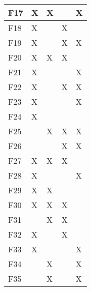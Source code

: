 \begin{tabular}{|l|l|l|l|l|}
F17                                                               & X      & X   &       & X          \\ \hline
F18                                                               & X      &     & X     &            \\ \hline
F19                                                               & X      &     & X     & X          \\ \hline
F20                                                               & X      & X   & X     &            \\ \hline
F21                                                               & X      &     &       & X          \\ \hline
F22                                                               & X      &     & X     & X          \\ \hline
F23                                                               & X      &     &       & X          \\ \hline
F24                                                               & X      &     &       &            \\ \hline
F25                                                               &        & X   & X     & X          \\ \hline
F26                                                               &        &     & X     & X          \\ \hline
F27                                                               & X      & X   & X     &            \\ \hline
F28                                                               & X      &     &       & X          \\ \hline
F29                                                               & X      & X   &       &            \\ \hline
F30                                                               & X      & X   & X     &            \\ \hline
F31                                                               &        & X   & X     &            \\ \hline
F32                                                               & X      &     & X     &            \\ \hline
F33                                                               & X      &     &       & X          \\ \hline
F34                                                               &        & X   &       & X          \\ \hline
F35                                                               &        & X   &       & X          \\ \hline
\end{tabular}